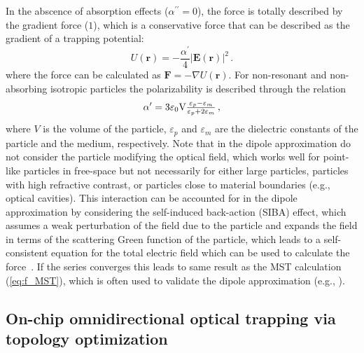 In the abscence of absorption effects ($\alpha^{\prime \prime}=0$), the force is totally described 
by the gradient force ($1$), which is a conservative force that can be described as the gradient 
of a trapping potential:
\begin{equation*}
    U (\mathbf{r}) = -\frac{\alpha^{\prime}}{4} \left|\mathbf{E}(\mathbf{r})\right|^2\,.
\end{equation*}
where the force can be calculated as $\mathbf{F} = -\nabla U(\mathbf{r})$. 
For non-resonant and non-absorbing isotropic particles the polarizability is 
described through the relation~\cite{BornWolf:1999:Book}
\begin{equation}
    \alpha^{\prime}= 3 \varepsilon_0 $V$ \frac{\varepsilon_p-\varepsilon_m}{\varepsilon_p+2 \varepsilon_m}\,,
\end{equation}
where $V$ is the volume of the particle, $\varepsilon_p$ and $\varepsilon_m$ are the
dielectric constants of the particle and the medium, respectively. Note that in the dipole approximation do not consider the particle modifying
the optical field, which works well for point-like particles in free-space but not necessarily 
for either large particles, particles with high refractive contrast, or particles close to material
boundaries (e.g., optical cavities). This interaction can be accounted for in the dipole
approximation by considering the self-induced back-action (SIBA) effect, which assumes a weak
perturbation of the field due to the particle and expands the field in terms of 
the scattering Green function of the particle, which leads to a self-consistent
equation for the total electric field which can be used to calculate the force~\cite{novotny, SIBA, benjamin}. If the series converges this leads 
to same result as the MST calculation (\eqref{eq:f_MST}), which is often used to validate the dipole approximation (e.g., \cite{ownpub1,ownpub3}). 

\subsection*{On-chip omnidirectional optical trapping via topology optimization~\cite{ownpub1}}

